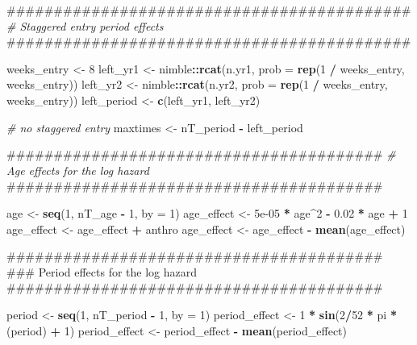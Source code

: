 \documentclass[11pt,]{article}
\newenvironment{Shaded}{\begin{snugshade}}{\end{snugshade}}
\newcommand{\KeywordTok}[1]{\textcolor[rgb]{0.13,0.29,0.53}{\textbf{#1}}}
\newcommand{\DataTypeTok}[1]{\textcolor[rgb]{0.13,0.29,0.53}{#1}}
\newcommand{\DecValTok}[1]{\textcolor[rgb]{0.00,0.00,0.81}{#1}}
\newcommand{\FloatTok}[1]{\textcolor[rgb]{0.00,0.00,0.81}{#1}}
\newcommand{\StringTok}[1]{\textcolor[rgb]{0.31,0.60,0.02}{#1}}
\newcommand{\CommentTok}[1]{\textcolor[rgb]{0.56,0.35,0.01}{\textit{#1}}}
\newcommand{\OperatorTok}[1]{\textcolor[rgb]{0.81,0.36,0.00}{\textbf{#1}}}
\newcommand{\NormalTok}[1]{#1}
\begin{document}
\begin{Shaded}
\begin{Highlighting}[]
\NormalTok{  ###########################################}
  \CommentTok{# Staggered entry period effects}
\NormalTok{  ###########################################}

\NormalTok{  weeks_entry <-}\StringTok{ }\DecValTok{8}
\NormalTok{  left_yr1 <-}\StringTok{ }\NormalTok{nimble}\OperatorTok{::}\KeywordTok{rcat}\NormalTok{(n.yr1, }\DataTypeTok{prob =} \KeywordTok{rep}\NormalTok{(}\DecValTok{1} \OperatorTok{/}\StringTok{ }\NormalTok{weeks_entry, weeks_entry))}
\NormalTok{  left_yr2 <-}\StringTok{ }\NormalTok{nimble}\OperatorTok{::}\KeywordTok{rcat}\NormalTok{(n.yr2, }\DataTypeTok{prob =} \KeywordTok{rep}\NormalTok{(}\DecValTok{1} \OperatorTok{/}\StringTok{ }\NormalTok{weeks_entry, weeks_entry))}
\NormalTok{  left_period <-}\StringTok{ }\KeywordTok{c}\NormalTok{(left_yr1, left_yr2)}

  \CommentTok{# no staggered entry}
\NormalTok{  maxtimes <-}\StringTok{ }\NormalTok{nT_period }\OperatorTok{-}\StringTok{ }\NormalTok{left_period}

\NormalTok{  ########################################}
  \CommentTok{# Age effects for the log hazard}
\NormalTok{  ########################################}

\NormalTok{  age <-}\StringTok{ }\KeywordTok{seq}\NormalTok{(}\DecValTok{1}\NormalTok{, nT_age }\OperatorTok{-}\StringTok{ }\DecValTok{1}\NormalTok{, }\DataTypeTok{by =} \DecValTok{1}\NormalTok{)}
\NormalTok{  age_effect <-}\StringTok{ }\FloatTok{5e-05} \OperatorTok{*}\StringTok{ }\NormalTok{age}\OperatorTok{^}\DecValTok{2} \OperatorTok{-}\StringTok{ }\FloatTok{0.02} \OperatorTok{*}\StringTok{ }\NormalTok{age }\OperatorTok{+}\StringTok{ }\DecValTok{1}
\NormalTok{  age_effect <-}\StringTok{ }\NormalTok{age_effect }\OperatorTok{+}\StringTok{ }\NormalTok{anthro}
\NormalTok{  age_effect <-}\StringTok{ }\NormalTok{age_effect }\OperatorTok{-}\StringTok{ }\KeywordTok{mean}\NormalTok{(age_effect)}
 
\NormalTok{  ########################################}
\NormalTok{  ### Period effects for the log hazard }
\NormalTok{  ########################################}

\NormalTok{  period <-}\StringTok{ }\KeywordTok{seq}\NormalTok{(}\DecValTok{1}\NormalTok{, nT_period }\OperatorTok{-}\StringTok{ }\DecValTok{1}\NormalTok{, }\DataTypeTok{by =} \DecValTok{1}\NormalTok{)}
\NormalTok{  period_effect <-}\StringTok{ }\DecValTok{1} \OperatorTok{*}\StringTok{ }\KeywordTok{sin}\NormalTok{(}\DecValTok{2}\OperatorTok{/}\DecValTok{52} \OperatorTok{*}\StringTok{ }\NormalTok{pi }\OperatorTok{*}\StringTok{ }\NormalTok{(period) }\OperatorTok{+}\StringTok{ }\DecValTok{1}\NormalTok{)}
\NormalTok{  period_effect <-}\StringTok{ }\NormalTok{period_effect }\OperatorTok{-}\StringTok{ }\KeywordTok{mean}\NormalTok{(period_effect)}


\end{Highlighting}
\end{Shaded}
\end{document}
